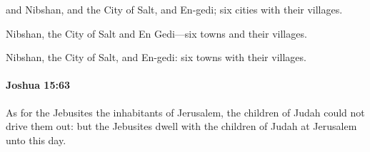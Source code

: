 			\begin{versebox}
					\item[BHS] 
					\item[ASV] and Nibshan, and the City of Salt, and En-gedi; six cities with their villages.
					\item[NIV] Nibshan, the City of Salt and En Gedi—six towns and their villages.
					\item[NRSV] Nibshan, the City of Salt, and En-gedi: six towns with their villages.
			\end{versebox}

		\paragraph{Joshua 15:63} %
			\label{JOSHUA-15-63}

			As for the Jebusites the inhabitants of Jerusalem, the children of Judah could not drive them out: but the Jebusites dwell with the children of Judah at Jerusalem unto this day.

